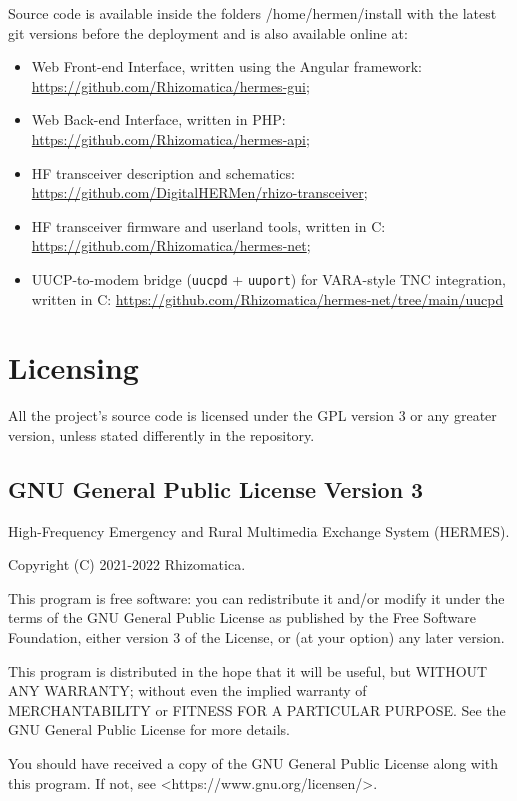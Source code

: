     Source code is available inside the folders /home/hermen/install with the latest git versions before the deployment and is also available online at:
\begin{itemize}
    \item Web Front-end Interface, written using the Angular framework: \url{https://github.com/Rhizomatica/hermes-gui};
    \item Web Back-end Interface, written in PHP: \url{https://github.com/Rhizomatica/hermes-api}; 
    \item HF transceiver description and schematics: \url{https://github.com/DigitalHERMen/rhizo-transceiver};
    \item HF transceiver firmware and userland tools, written in C:
    \url{https://github.com/Rhizomatica/hermes-net};
    \item UUCP-to-modem bridge (\texttt{uucpd} + \texttt{uuport}) for VARA-style TNC integration, written in C:
    \url{https://github.com/Rhizomatica/hermes-net/tree/main/uucpd}
\end{itemize}


\section{Licensing}
\label{apx_license}

    All the project's source code is licensed under the GPL version 3 or any greater version, unless stated differently in the repository.

\subsection{GNU General Public License Version 3}

    High-Frequency Emergency and Rural Multimedia Exchange System (HERMES).

    Copyright (C) 2021-2022 Rhizomatica.
\newline

    This program is free software: you can redistribute it and/or modify
    it under the terms of the GNU General Public License as published by
    the Free Software Foundation, either version 3 of the License, or
    (at your option) any later version.

    This program is distributed in the hope that it will be useful,
    but WITHOUT ANY WARRANTY; without even the implied warranty of
    MERCHANTABILITY or FITNESS FOR A PARTICULAR PURPOSE.  See the
    GNU General Public License for more details.

    You should have received a copy of the GNU General Public License
    along with this program.  If not, see <https://www.gnu.org/licensen/>.
    
